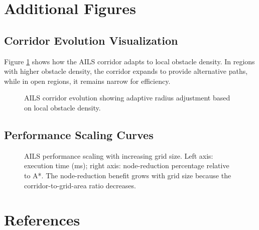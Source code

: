 \documentclass[11pt]{article}
\begin{document}
\section{Additional Figures}

\subsection{Corridor Evolution Visualization}

Figure \ref{fig:corridor_evolution} shows how the AILS corridor adapts to local obstacle density. In regions with higher obstacle density, the corridor expands to provide alternative paths, while in open regions, it remains narrow for efficiency.

\begin{figure}[H]
\centering
\caption{AILS corridor evolution showing adaptive radius adjustment based on local obstacle density.}
\label{fig:corridor_evolution}
\end{figure}

\subsection{Performance Scaling Curves}

\begin{figure}[H]
\centering
\caption{AILS performance scaling with increasing grid size. Left axis: execution time (ms); right axis: node-reduction percentage relative to A*. The node-reduction benefit grows with grid size because the corridor-to-grid-area ratio decreases.}
\label{fig:scaling}
\end{figure}

\section*{References}



\end{document}
